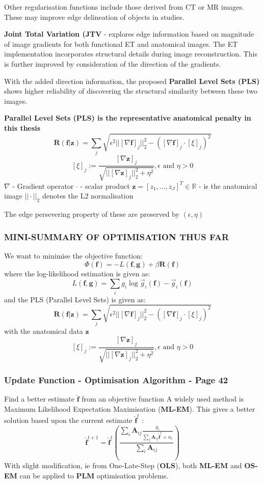 \documentclass{article}
\begin{document}
Other regularisation functions include those derived from CT or MR images. These may improve edge delineation of objects in studies. 

\textbf{Joint Total Variation (JTV} - explores edge information based on magnitude of image gradients for both functional ET and anatomical images. The ET implementation incorporates structural details during image reconstruction. This is further improved by consideration of the direction of the gradients.

With the added direction information, the proposed \textbf{Parallel Level Sets (PLS)} shows higher reliability of discovering the structural similarity between these two images.

\textbf{Parallel Level Sets (PLS) is the representative anatomical penalty in this thesis}
\[
\textbf{R}(\textbf{f}|\textbf{z}) = 
\sum_j \sqrt{ \epsilon^2 || [\nabla \textbf{f}]_j ||_2^2 - ([\nabla \textbf{f}]_j \cdot [\xi]_j)^2}
\]
\[
[\xi]_j :=  \frac{[\nabla \textbf{z}]_j}{\sqrt{ ||[\nabla \textbf{z}]_j||_2^2 + \eta^2 }},
\epsilon \text{ and }  \eta >0
\]
$\nabla$ - Gradient operator
$\cdot$ - scalar product
$\textbf{z} = [z_1,...,z_J]^T \in \mathbb{R}$ - is the anatomical image
$||\cdot||_2$ denotes the L2 normalisation 

The edge persevering property of these are preserved by $(\epsilon, \eta)$ 

\subsubsection{MINI-SUMMARY OF OPTIMISATION THUS FAR}
We want to minimise the objective function:
\[\Phi(\textbf{f}) = -L(\textbf{f},\textbf{g})  + \beta \textbf{R}(\textbf{f})\]
where the log-likelihood estimation is given as:
\[ L(\textbf{f},\textbf{g}) = \sum_i g_i \log \vec{g}_i (\textbf{f}) - \vec{g}_i (\textbf{f}) \]
and the PLS (Parallel Level Sets) is given as:
\[
\textbf{R}(\textbf{f}|\textbf{z}) = 
\sum_j \sqrt{ \epsilon^2 || [\nabla \textbf{f}]_j ||_2^2 - ([\nabla \textbf{f}]_j \cdot [\xi]_j)^2}
\]
with the anatomical data $\textbf{z}$ 
\[ [\xi]_j :=  \frac{[\nabla \textbf{z}]_j}{\sqrt{ ||[\nabla \textbf{z}]_j||_2^2 + \eta^2 }},\epsilon \text{ and }  \eta >0 \]
\subsubsection{Update Function - Optimisation Algorithm  - Page 42}
Find a better estimate $\hat{\textbf{f}}$ from an objective function
A widely used method is Maximum Likelihood Expectation Maximisation (\textbf{ML-EM}). This gives a better solution based upon the current estimate $\hat{\textbf{f}}^t$ :
\[\hat{\textbf{f}}^{t+1} = \hat{\textbf{f}}^t ( \frac{\sum_i \textbf{A}_{ij} \frac{g_i}{\sum_j  \textbf{A}_{ij} \hat{\textbf{f}}^t  +n_i}  }{\sum_i \textbf{A}_{ij}}    )
\]
With slight modification, ie from One-Late-Step (\textbf{OLS}), both \textbf{ML-EM} and \textbf{OS-EM} can be applied to \textbf{PLM} optimisation problems.
\end{document}
